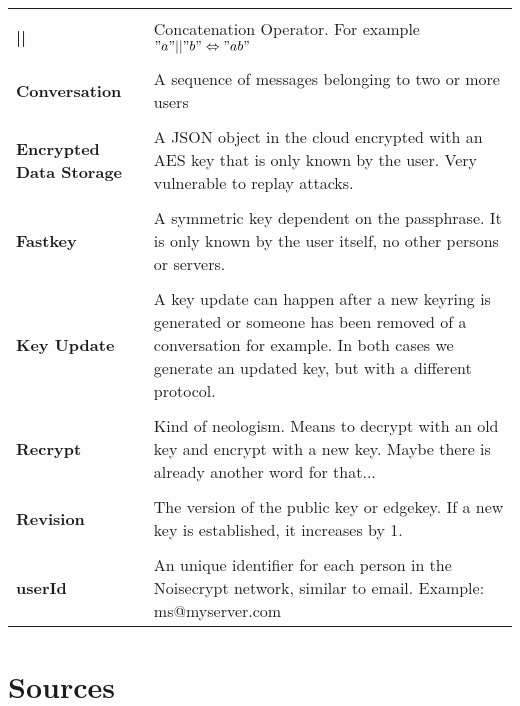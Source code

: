 \documentclass{scrartcl}
\begin{document}
\begin{tabular}{p{4cm} p{10cm} }
          &  \\
\textbf{||} &  Concatenation Operator. For example $"a" || "b" \Leftrightarrow "ab" $ \\\\
\textbf{Conversation} & A sequence of messages belonging to two or more users  \\\\

\textbf{Encrypted Data Storage} & A JSON object in the cloud encrypted with an AES key that is only known by the user. Very vulnerable to replay attacks. \\\\

\textbf{Fastkey} & A symmetric key dependent on the passphrase. It is only known by the user itself, no other persons or servers. \\\\

\textbf{Key Update} &
A key update can happen after a new keyring is generated or someone has been removed of a conversation for example. In both cases we generate an updated key, but with a different protocol. \\\\


\textbf{Recrypt} &
Kind of neologism. Means to decrypt with an old key and encrypt with a new key. Maybe there is already another word for that...\\\\

\textbf{Revision} &
The version of the public key or edgekey. If a new key is established, it increases by 1.\\\\

\textbf{userId} &  An unique identifier for each person in the Noisecrypt network, similar to email. Example: ms@myserver.com
\end{tabular}


\clearpage
\section{Sources}
\printbibliography




  
\end{document}
